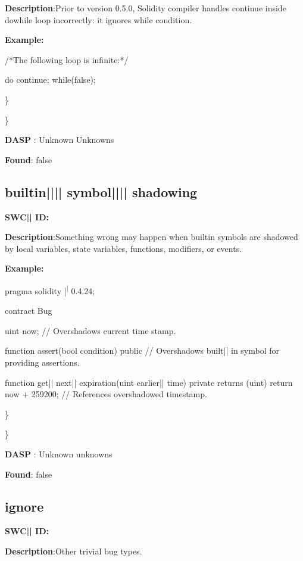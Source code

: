 \documentclass{article}
\begin{document}
\textbf{Description}:Prior to version 0.5.0, Solidity compiler handles continue inside do{\textendash}while loop incorrectly: it ignores while condition.


\textbf{Example:} 
\begin{ffcode} 

/*The following loop is infinite:*/ 

do {
    continue;
} while(false);

\end{ffcode} 
\} 

\} 

\textbf{DASP} : Unknown Unknowns

\textbf{Found}: false

\subsection{builtin{||\textunderscore|| }symbol{||\textunderscore|| }shadowing} 
\textbf{SWC{|\textunderscore| }ID:} 

\textbf{Description}:Something wrong may happen when built{\textendash}in symbols are shadowed by local variables, state variables, functions, modifiers, or events.


\textbf{Example:} 
\begin{ffcode} 

pragma solidity |\textsuperscript| 0.4.24;

contract Bug {
    uint now; // Overshadows current time stamp.

    function assert(bool condition) public {
        // Overshadows built|\textendash| in symbol for providing assertions.
    }

    function get|\textunderscore| next|\textunderscore| expiration(uint earlier|\textunderscore| time) private returns (uint) {
        return now + 259200; // References overshadowed timestamp.
    }
}

\end{ffcode} 
\} 

\} 

\textbf{DASP} : Unknown unknowns

\textbf{Found}: false

\subsection{ignore} 
\textbf{SWC{|\textunderscore| }ID:} 

\textbf{Description}:Other trivial bug types.
\end{document}
